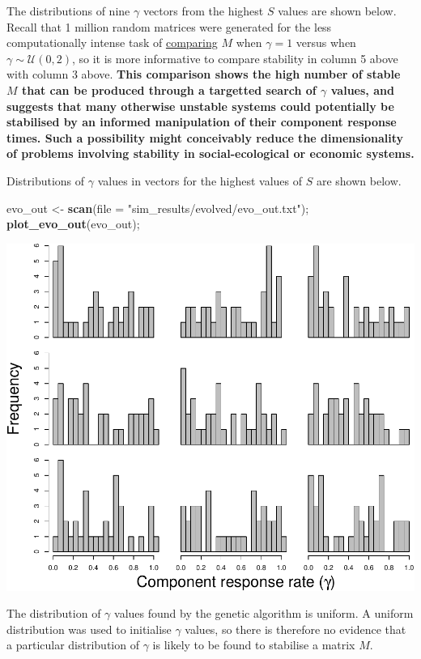 \documentclass[]{article}
\newenvironment{Shaded}{\begin{snugshade}}{\end{snugshade}}
\newcommand{\KeywordTok}[1]{\textcolor[rgb]{0.13,0.29,0.53}{\textbf{{#1}}}}
\newcommand{\DataTypeTok}[1]{\textcolor[rgb]{0.13,0.29,0.53}{{#1}}}
\newcommand{\StringTok}[1]{\textcolor[rgb]{0.31,0.60,0.02}{{#1}}}
\newcommand{\NormalTok}[1]{{#1}}
\begin{document}
The distributions of nine \(\gamma\) vectors from the highest \(S\)
values are shown below. Recall that 1 million random matrices were
generated for the less computationally intense task of
\protect\hyperlink{IncrS}{comparing} \(M\) when \(\gamma = 1\) versus
when \(\gamma \sim \mathcal{U}(0, 2)\), so it is more informative to
compare stability in column 5 above with column 3 above. \textbf{This
comparison shows the high number of stable \(M\) that can be produced
through a targetted search of \(\gamma\) values, and suggests that many
otherwise unstable systems could potentially be stabilised by an
informed manipulation of their component response times. Such a
possibility might conceivably reduce the dimensionality of problems
involving stability in social-ecological or economic systems.}

Distributions of \(\gamma\) values in vectors for the highest values of
\(S\) are shown below.

\begin{Shaded}
\begin{Highlighting}[]
\NormalTok{evo_out <-}\StringTok{ }\KeywordTok{scan}\NormalTok{(}\DataTypeTok{file =} \StringTok{"sim_results/evolved/evo_out.txt"}\NormalTok{);}
\KeywordTok{plot_evo_out}\NormalTok{(evo_out);}
\end{Highlighting}
\end{Shaded}

\includegraphics{unnamed-chunk-31-1.pdf}

The distribution of \(\gamma\) values found by the genetic algorithm is
uniform. A uniform distribution was used to initialise \(\gamma\)
values, so there is therefore no evidence that a particular distribution
of \(\gamma\) is likely to be found to stabilise a matrix \(M\).
\end{document}
